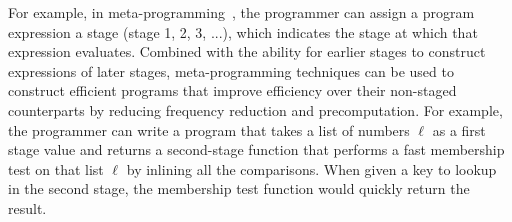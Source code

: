 For example, in meta-programming~\cite{}, the programmer can assign a
program expression a stage (stage 1, 2, 3, ...), which indicates the
stage at which that expression evaluates.  Combined with the ability
for earlier stages to construct expressions of later stages,
meta-programming techniques can be used to construct efficient
programs that improve efficiency over their non-staged counterparts by
reducing frequency reduction and precomputation.  For example, the
programmer can write a program that takes a list of numbers $\ell$ as
a first stage value and returns a second-stage function that performs
a fast membership test on that list $\ell$ by inlining all the
comparisons.  When given a key to lookup in the second stage, the
membership test function would quickly return the result.




